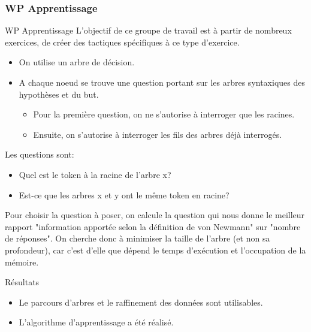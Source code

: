 \begin{frame}
\frametitle{WP Apprentissage} 
WP Apprentissage
L'objectif de ce groupe de travail est à partir de nombreux exercices, de créer des tactiques spécifiques à ce type d'exercice.
\end{frame}
\begin{frame}

\begin{itemize}
    \item On utilise un arbre de décision. 
    \item A chaque noeud se trouve une question portant sur les arbres syntaxiques des hypothèses et du but. 
\begin{itemize}
    \item Pour la première question, on ne s'autorise à interroger que les racines.
    \item Ensuite, on s'autorise à interroger les fils des arbres déjà interrogés.
\end{itemize}
\end{itemize}

\end{frame}

\begin{frame}

Les questions sont:
\begin{itemize}
    \item Quel est le token à la racine de l'arbre x?
    \item Est-ce que les arbres x et y ont le même token en racine?
\end{itemize}


Pour choisir la question à poser, 
on calcule la question qui nous donne le meilleur rapport "information apportée selon la définition de von Newmann" sur "nombre de réponses". 
On cherche donc à minimiser la taille de l'arbre (et non sa profondeur),
car c'est d'elle que dépend le temps d'exécution et l'occupation de la mémoire.
\end{frame}
\begin{frame}

Résultats
\begin{itemize}
    \item Le parcours d'arbres et le raffinement des données sont utilisables.
    \item L'algorithme d'apprentissage a été réalisé.
\end{itemize}




\end{frame}
